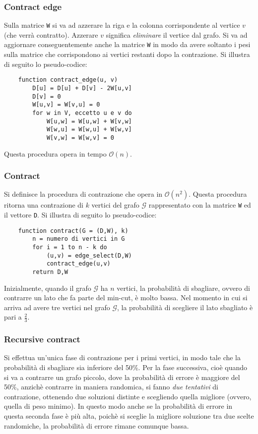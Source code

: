 \subsubsection*{Contract edge}
Sulla matrice \verb|W| si va 
ad azzerare la riga e la colonna corrispondente al vertice $v$ (che verrà 
contratto). Azzerare $v$ significa \textit{eliminare} il vertice dal grafo. Si va 
ad aggiornare conseguentemente anche la matrice \verb|W| in modo da avere soltanto 
i pesi sulla matrice che corrispondono ai vertici restanti dopo la contrazione. 
Si illustra di seguito lo pseudo-codice:
\pagebreak
\begin{verbatim}
    function contract_edge(u, v)
        D[u] = D[u] + D[v] - 2W[u,v]
        D[v] = 0
        W[u,v] = W[v,u] = 0
        for w in V, eccetto u e v do
            W[u,w] = W[u,w] + W[v,w]
            W[w,u] = W[w,u] + W[w,v]
            W[v,w] = W[w,v] = 0
\end{verbatim}
Questa procedura opera in tempo $\mathcal{O}(n)$.

\subsubsection*{Contract}
Si definisce la procedura di contrazione che opera in 
$\mathcal{O}(n^2)$. Questa procedura ritorna una contrazione di $k$ vertici del 
grafo $\mathcal{G}$ rappresentato con la matrice \verb|W| ed il vettore \verb|D|.
Si illustra di seguito lo pseudo-codice:
\begin{verbatim}
    function contract(G = (D,W), k)
        n = numero di vertici in G
        for i = 1 to n - k do
            (u,v) = edge_select(D,W)
            contract_edge(u,v)
        return D,W
\end{verbatim}
Inizialmente, quando il grafo $\mathcal{G}$ ha $n$ vertici, la probabilità di 
sbagliare, ovvero di contrarre un lato che fa parte del min-cut, è molto bassa. 
Nel momento in cui si arriva ad avere tre vertici nel grafo $\mathcal{G}$, la 
probabilità di scegliere il lato sbagliato è pari a $\frac{2}{3}$.

\subsubsection*{Recursive contract}
Si effettua un'unica fase di contrazione per i primi vertici, in modo tale 
che la probabilità di sbagliare sia inferiore del 50\%. Per la fase successiva, 
cioè quando si va a contrarre un grafo piccolo, dove la probabilità di errore è 
maggiore del 50\%, anzichè contrarre in maniera randomica, si fanno 
\textit{due tentativi} di contrazione, ottenendo due soluzioni distinte e scegliendo 
quella migliore (ovvero, quella di peso minimo). In questo modo anche se la probabilità 
di errore in questa seconda fase è più alta, poichè si sceglie la migliore soluzione 
tra due scelte randomiche, la probabilità di errore rimane comunque bassa.

